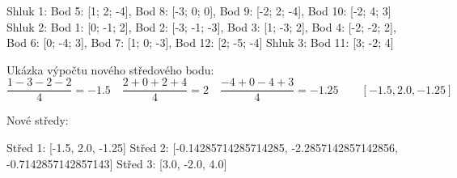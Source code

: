 \documentclass[12pt]{article}
\begin{document}
\flushleft
Shluk 1: Bod 5: [1; 2; -4], Bod 8: [-3; 0; 0], Bod 9: [-2; 2; -4], Bod 10: [-2; 4; 3] \newline
Shluk 2: Bod 1: [0; -1; 2], Bod 2: [-3; -1; -3], Bod 3: [1; -3; 2], Bod 4: [-2; -2; 2], \newline
\null\quad\quad\qquad Bod 6: [0; -4; 3], Bod 7: [1; 0; -3],  Bod 12: [2; -5; -4] \newline
Shluk 3: Bod 11: [3; -2; 4]

\vspace{0.5cm}
Ukázka výpočtu nového středového bodu: \[\frac{1 - 3 - 2 - 2}{4} = -1.5 \quad \frac{2+0+2+4}{4} = 2 \quad \frac{-4+0-4+3}{4} = -1.25 \qquad [-1.5, 2.0, -1.25]\]

\newpage
Nové středy: \newline

\vspace{0.05cm}

Střed 1: [-1.5, 2.0, -1.25] \newline
Střed 2: [-0.14285714285714285, -2.2857142857142856, -0.7142857142857143] \newline
Střed 3: [3.0, -2.0, 4.0] \newline

\vspace{0.5cm}
\end{document}
